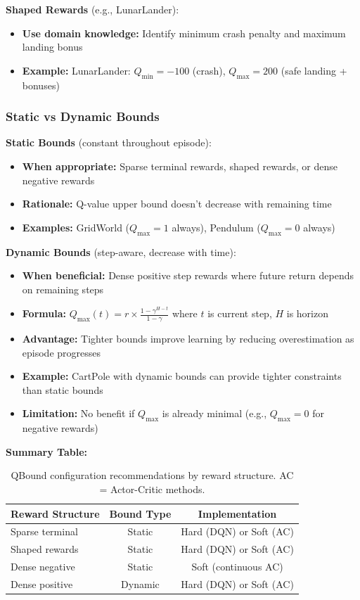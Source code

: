 \documentclass[11pt]{article}
\theoremstyle{definition}
\theoremstyle{remark}
\begin{document}
\textbf{Shaped Rewards} (e.g., LunarLander):
\begin{itemize}
    \item \textbf{Use domain knowledge:} Identify minimum crash penalty and maximum landing bonus
    \item \textbf{Example:} LunarLander: $Q_{\min} = -100$ (crash), $Q_{\max} = 200$ (safe landing + bonuses)
\end{itemize}

\subsubsection{Static vs Dynamic Bounds}
\label{sec:step-aware-bounds}

\textbf{Static Bounds} (constant throughout episode):
\begin{itemize}
    \item \textbf{When appropriate:} Sparse terminal rewards, shaped rewards, or dense negative rewards
    \item \textbf{Rationale:} Q-value upper bound doesn't decrease with remaining time
    \item \textbf{Examples:} GridWorld ($Q_{\max}=1$ always), Pendulum ($Q_{\max}=0$ always)
\end{itemize}

\textbf{Dynamic Bounds} (step-aware, decrease with time):
\begin{itemize}
    \item \textbf{When beneficial:} Dense positive step rewards where future return depends on remaining steps
    \item \textbf{Formula:} $Q_{\max}(t) = r \times \frac{1 - \gamma^{H-t}}{1 - \gamma}$ where $t$ is current step, $H$ is horizon
    \item \textbf{Advantage:} Tighter bounds improve learning by reducing overestimation as episode progresses
    \item \textbf{Example:} CartPole with dynamic bounds can provide tighter constraints than static bounds
    \item \textbf{Limitation:} No benefit if $Q_{\max}$ is already minimal (e.g., $Q_{\max}=0$ for negative rewards)
\end{itemize}

\textbf{Summary Table:}

\begin{table}[H]
\centering
\small
\begin{tabular}{@{}lcc@{}}
\toprule
\textbf{Reward Structure} & \textbf{Bound Type} & \textbf{Implementation} \\
\midrule
Sparse terminal & Static & Hard (DQN) or Soft (AC) \\
Shaped rewards & Static & Hard (DQN) or Soft (AC) \\
Dense negative & Static & Soft (continuous AC) \\
Dense positive & Dynamic & Hard (DQN) or Soft (AC) \\
\bottomrule
\end{tabular}
\caption{QBound configuration recommendations by reward structure. AC = Actor-Critic methods.}
\label{tab:qbound-guidelines}
\end{table}
\end{document}
